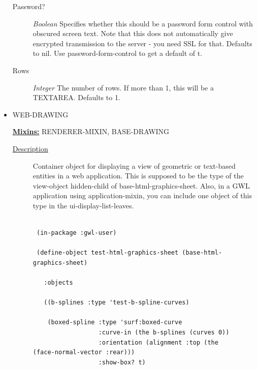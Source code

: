 \documentclass [11pt]{book}
\begin{document}
\begin{itemize}
\begin{description}
\item [Password?]
\emph{Boolean} Specifies whether this should be a password form control with obscured screen text.
Note that this does not automatically give encrypted transmission to the server - you need SSL
for that. Defaults to nil. Use password-form-control to get a default of t.


\item [Rows]
\emph{Integer} The number of rows. If more than 1, this will be a TEXTAREA. Defaults to 1.


\end{description}







\item {}WEB-DRAWING


\textbf{
\underline{Mixins:}} RENDERER-MIXIN, BASE-DRAWING





\begin{description}

\item [
\underline{Description}]


Container object for displaying a view of geometric 
or text-based entities in a web application. This is supposed to be the type of the
view-object hidden-child of base-html-graphics-sheet. Also, in a GWL application using 
application-mixin, you can include one object of this type in the ui-display-list-leaves.




\end{description}




\begin{figure}
\begin{lrbox}{\boxedverb}
\begin{minipage}{\linewidth}
{\small

\begin{verbatim}

 (in-package :gwl-user)

 (define-object test-html-graphics-sheet (base-html-graphics-sheet)
    
   :objects 

   ((b-splines :type 'test-b-spline-curves)
   
    (boxed-spline :type 'surf:boxed-curve
                  :curve-in (the b-splines (curves 0))
                  :orientation (alignment :top (the (face-normal-vector :rear)))
                  :show-box? t)


\end{verbatim}}
\end{minipage}
\end{lrbox}
\end{figure}
\end{itemize}
\end{document}
